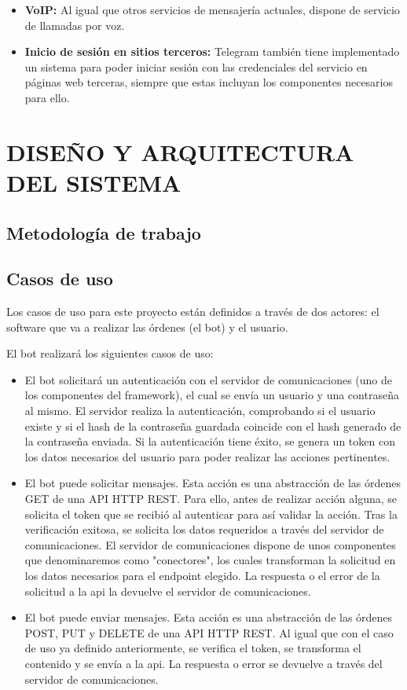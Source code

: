 \documentclass[spanish,12pt, a4paper, twoside]{paper}
\let\oldsection\section
\def\section{\cleardoublepage\oldsection}
\begin{document}
\begin{itemize}
\item \textbf{VoIP:} Al igual que otros servicios de mensajería actuales, dispone de servicio de llamadas por voz. 

\item \textbf{Inicio de sesión en sitios terceros:} Telegram también tiene implementado un sistema para poder iniciar sesión con las credenciales del servicio en páginas web terceras, siempre que estas incluyan los componentes necesarios para ello. 

\end{itemize}

\section{DISEÑO Y ARQUITECTURA DEL SISTEMA}

\subsection{Metodología de trabajo}

\subsection{Casos de uso}

Los casos de uso para este proyecto están definidos a través de dos actores: el software que va a realizar las órdenes (el bot) y el usuario.

El bot realizará los siguientes casos de uso:

\begin{itemize}
\item El bot solicitará un autenticación con el servidor de comunicaciones (uno de los componentes del framework), el cual se envía un usuario y una contraseña al mismo. El servidor realiza la autenticación, comprobando si el usuario existe y si el hash de la contraseña guardada coincide con el hash generado de la contraseña enviada. Si la autenticación tiene éxito, se genera un token con los datos necesarios del usuario para poder realizar las acciones pertinentes.

\item El bot puede solicitar mensajes. Esta acción es una abstracción de las órdenes GET de una API HTTP REST. Para ello, antes de realizar acción alguna, se solicita el token que se recibió al autenticar para así validar la acción. Tras la verificación exitosa, se solicita los datos requeridos a través del servidor de comunicaciones. El servidor de comunicaciones dispone de unos componentes que denominaremos como "conectores", los cuales transforman la solicitud en los datos necesarios para el endpoint elegido. La respuesta o el error de la solicitud a la api la devuelve el servidor de comunicaciones.

\item El bot puede enviar mensajes. Esta acción es una abstracción de las órdenes POST, PUT y DELETE de una API HTTP REST. Al igual que con el caso de uso ya definido anteriormente, se verifica el token, se transforma el contenido y se envía a la api. La respuesta o error se devuelve a través del servidor de comunicaciones.
\end{itemize}
\end{document}
